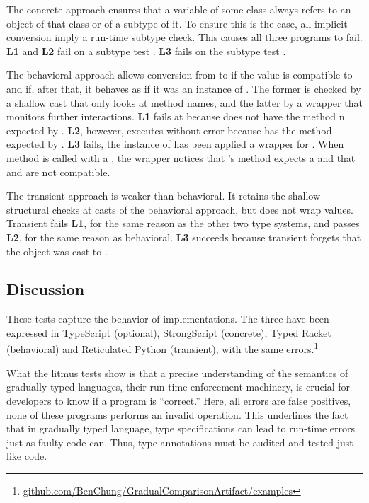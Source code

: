 \documentclass[USenglish]{tex/lipics-v2016}
\begin{document}
\vspace{2mm} The concrete approach ensures that a
variable of some class \C always refers to an object of that class or of a
subtype of it.  To ensure this is the case, all implicit conversion imply a
run-time subtype check.  This causes all three programs to fail. {\bf L1}
and {\bf L2} fail on a subtype test \StrSub{}\K\A\I.  {\bf L3} fails on the
subtype test \StrSub{}\K\C\E.

\vspace{2mm} The behavioral approach allows
conversion from \any to \C if the value is compatible to \C and if,
after that, it behaves as if it was an instance of \C.  The former is
checked by a shallow cast that only looks at method names, and the
latter by a wrapper that monitors further interactions.  {\bf L1} fails at
because \A does not have the method \xt n expected by \I. {\bf L2}, however,
executes without error because \A has the method \m expected by \I. {\bf L3} fails, the instance of \C has been applied
a wrapper for \E.  When method \a is called with a \C, the wrapper notices
that \E's method \a expects a \D and that \C and \D are not compatible.

\vspace{2mm} The transient approach is weaker
than behavioral. It retains the shallow structural checks at casts of the
behavioral approach, but does not wrap values. Transient fails {\bf L1}, for
the same reason as the other two type systems, and passes {\bf L2}, for the
same reason as behavioral.  {\bf L3} succeeds because transient forgets that
the \C object was cast to \E.

\subsection{Discussion}

These tests capture the behavior of implementations. The three have been
expressed in TypeScript (optional), StrongScript (concrete), Typed Racket
(behavioral) and Reticulated Python (transient), with the same
errors.\footnote{\small
  \url{github.com/BenChung/GradualComparisonArtifact/examples}}

What the litmus tests show is that a precise understanding of the semantics
of gradually typed languages, their run-time enforcement machinery, is
crucial for developers to know if a program is ``correct.''  Here, all
errors are false positives, none of these programs performs an invalid
operation. This underlines the fact that in gradually typed language, type
specifications can lead to run-time errors just as faulty code can. Thus,
type annotations must be audited and tested just like code.
\end{document}
